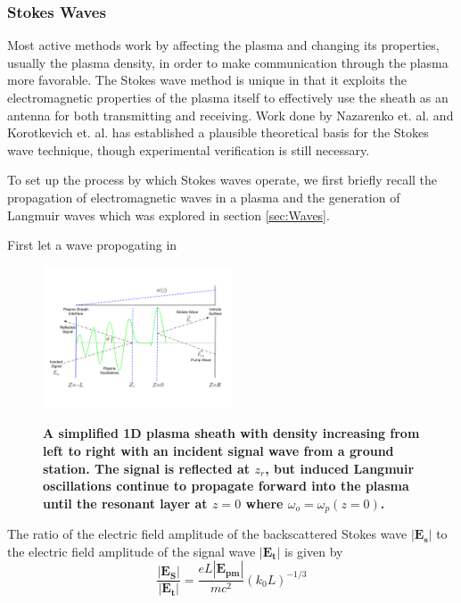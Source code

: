 \documentclass[twocolumn]{article}
\begin{document}
		\subsubsection*{Stokes Waves}
			Most active methods work by affecting the plasma and changing its properties, usually the plasma density, in order to make communication through the plasma more favorable.
			The Stokes wave method is unique in that it exploits the electromagnetic properties of the plasma itself to effectively use the sheath as an antenna for both transmitting and receiving.
			Work done by Nazarenko et. al. and Korotkevich et. al. has established a plausible theoretical basis for the Stokes wave technique, though experimental verification is still necessary.\cite{nazarenko_communication_1994}\cite{korotkevich_communication_2007}
			
			To set up the process by which Stokes waves operate, we first briefly recall the propagation of electromagnetic waves in a plasma and the generation of Langmuir waves which was explored in section \ref{sec:Waves}.
			
			First let a wave propogating in 
			
			\begin{figure}[t]
				\centering
				\includegraphics[width = 0.5\textwidth]{Images/StokesDiagram.png}
				\label{subfig:Stokes2}
				\caption{\textbf{A simplified 1D plasma sheath with density increasing from left to right with an incident signal wave from a ground station. The signal is reflected at $z_r$, but induced Langmuir oscillations continue to propagate forward into the plasma until the resonant layer at $z=0$ where $\omega_o = \omega_p(z=0)$.}}
				\label{fig:StokesDiagram}
			\end{figure}
			
			The ratio of the electric field amplitude of the backscattered Stokes wave  $\left|\mathbf{E_s}\right|$ to the electric field amplitude of the signal wave $\left|\mathbf{E_t}\right|$ is given by
			\begin{equation}
				\frac{\left|\mathbf{E_S}\right|}{\left|\mathbf{E_t}\right|} = \frac{eL\left|\mathbf{E_{pm}}\right|}{mc^2} \left(k_0 L\right)^{-1/3}
			\end{equation}
			
\end{document}
